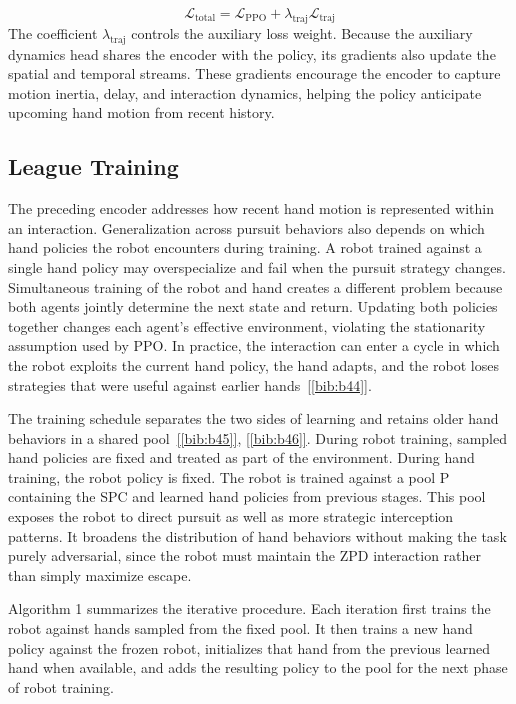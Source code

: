 \documentclass[journal,twoside,web]{ieeecolor2}
\newcommand{\citelink}[1]{\hyperref[bib:#1]{[\ref*{bib:#1}]}}
\begin{document}
\begin{equation}
\mathcal{L}_{\mathrm{total}} = \mathcal{L}_{\mathrm{PPO}} + \lambda_{\mathrm{traj}}\mathcal{L}_{\mathrm{traj}}
\label{eq:total_loss}
\end{equation}
The coefficient $\lambda_{\mathrm{traj}}$ controls the auxiliary loss weight. Because the auxiliary dynamics head shares the encoder with the policy, its gradients also update the spatial and temporal streams. These gradients encourage the encoder to capture motion inertia, delay, and interaction dynamics, helping the policy anticipate upcoming hand motion from recent history.

\subsection{League Training}
The preceding encoder addresses how recent hand motion is represented within an interaction. Generalization across pursuit behaviors also depends on which hand policies the robot encounters during training. A robot trained against a single hand policy may overspecialize and fail when the pursuit strategy changes. Simultaneous training of the robot and hand creates a different problem because both agents jointly determine the next state and return. Updating both policies together changes each agent's effective environment, violating the stationarity assumption used by PPO. In practice, the interaction can enter a cycle in which the robot exploits the current hand policy, the hand adapts, and the robot loses strategies that were useful against earlier hands~\citelink{b44}.

The training schedule separates the two sides of learning and retains older hand behaviors in a shared pool~\citelink{b45}, \citelink{b46}. During robot training, sampled hand policies are fixed and treated as part of the environment. During hand training, the robot policy is fixed. The robot is trained against a pool P containing the SPC and learned hand policies from previous stages. This pool exposes the robot to direct pursuit as well as more strategic interception patterns. It broadens the distribution of hand behaviors without making the task purely adversarial, since the robot must maintain the ZPD interaction rather than simply maximize escape.

Algorithm 1 summarizes the iterative procedure. Each iteration first trains the robot against hands sampled from the fixed pool. It then trains a new hand policy against the frozen robot, initializes that hand from the previous learned hand when available, and adds the resulting policy to the pool for the next phase of robot training.
\end{document}
